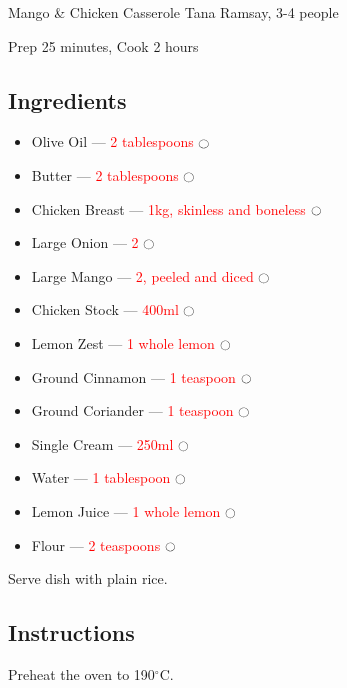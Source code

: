 \documentclass[12pt]{article}%
\newcommand{\tick}{\dotfill\(\ocircle\)}
\newcommand{\blue}[1]{\textcolor{blue!70!white}{#1}}
\newcommand{\red}[1]{\textcolor{red}{#1}}
\newcommand{\green}[1]{\textcolor{green!70!black}{#1}}
\begin{document}

{\LARGE \blue{Mango \& Chicken Casserole} \hfill\normalsize Tana Ramsay, 3-4 people}

\vspace{-\baselineskip}\hrulefill

\vspace{-0.5\baselineskip}\hfill {\footnotesize Prep \green{25 minutes}, Cook \green{2 hours}}

\subsection*{Ingredients}

\begin{itemize}[nolistsep]
    \item Olive Oil --- \red{2 tablespoons} \tick
    \item Butter --- \red{2 tablespoons} \tick
    \item Chicken Breast --- \red{1kg, skinless and boneless} \tick
    \item Large Onion --- \red{2} \tick
    \item Large Mango --- \red{2, peeled and diced} \tick
    \item Chicken Stock --- \red{400ml} \tick
    \item Lemon Zest --- \red{1 whole lemon} \tick
    \item Ground Cinnamon --- \red{1 teaspoon} \tick
    \item Ground Coriander --- \red{1 teaspoon} \tick
    \item Single Cream --- \red{250ml} \tick
    \item Water --- \red{1 tablespoon} \tick
    \item Lemon Juice --- \red{1 whole lemon} \tick
    \item Flour --- \red{2 teaspoons} \tick
\end{itemize}

Serve dish with plain rice.

\subsection*{Instructions}

Preheat the oven to 190\(^{\circ}\)C.
\end{document}
